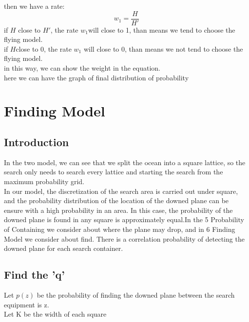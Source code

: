 \documentclass[11pt]{article}
\begin{document}
then we have a rate:\\
\[w_1=\frac{H}{H'}\]
if $H$ close to $H'$, the rate $w_1 $will close to 1, than means we tend to choose the flying model.\\
if $H $close to 0, the rate $w_1$ will close to 0, than means we not tend to choose the flying model.\\
in this way, we can show the weight in the equation.\\
here we can have the graph of final distribution of probability\\
\begin{center}
    \end{center}

    \hypertarget{finding Model}{%
\section{Finding Model}\label{finding Model}}
\hypertarget{introduction}{%
\subsection{ Introduction}\label{ Introduction}}
In the two model, we can see that we split the ocean into a square lattice, so the search only needs to search every lattice and starting the search from the maximum probability grid.\\
In our model, the discretization of the search area is carried out under square, and the probability distribution of the location of the downed plane can be ensure with a high probability in an area. In this case, the probability of the downed plane is found in any square is approximately equal.In the 5 Probability of Containing we consider about where the plane may drop, and in 6 Finding Model we consider about find. There is a correlation probability of detecting the downed plane for each search container. 
\hypertarget{ Find the 'q'}{%
\subsection{  Find the 'q'}\label{  Find the 'q'}}
Let $p(z)$ be the probability of finding the downed plane between the search equipment is z.\\
Let K be the width of each square\\
\begin{center}
    \end{center}
\end{document}
